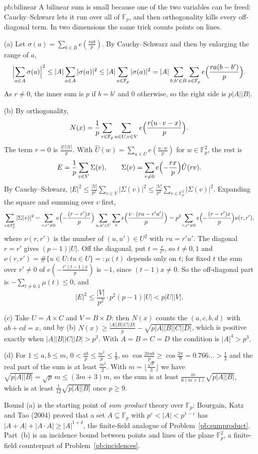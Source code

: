 \begin{solution}{pb:bilinear}
\idea A bilinear sum is small because one of the two variables can be freed: Cauchy--Schwarz lets it run over all of $\mathbb F_p$,
and then orthogonality kills every off-diagonal term. In two dimensions the same trick counts points on lines.

\writeup (a) Let $\sigma(a)=\sum_{b\in B}e(\frac{rab}p)$. By Cauchy--Schwarz and then by enlarging the range of $a$,
\[
\Bigl|\sum_{a\in A}\sigma(a)\Bigr|^2\le|A|\sum_{a\in A}|\sigma(a)|^2\le|A|\sum_{a\in\mathbb F_p}|\sigma(a)|^2=|A|\sum_{b,b'\in B}\sum_{a\in\mathbb F_p}e\Bigl(\frac{ra(b-b')}p\Bigr).
\]
As $r\ne0$, the inner sum is $p$ if $b=b'$ and $0$ otherwise, so the right side is $p|A||B|$.

(b) By orthogonality,
\[
N(x)=\frac1p\sum_{r\in\mathbb F_p}\sum_{u\in U,v\in V}e\Bigl(\frac{r(u\cdot v-x)}p\Bigr).
\]
The term $r=0$ is $\frac{|U||V|}p$. With $\hat U(w)=\sum_{u\in U}e(\frac{u\cdot w}p)$ for $w\in\mathbb F_p^2$, the rest is
\[
E=\frac1p\sum_{v\in V}\Sigma(v),\qquad\Sigma(v)=\sum_{r\ne0}e\Bigl(-\frac{rx}p\Bigr)\hat U(rv).
\]
By Cauchy--Schwarz, $|E|^2\le\frac{|V|}{p^2}\sum_{v\in V}|\Sigma(v)|^2\le\frac{|V|}{p^2}\sum_{v\in\mathbb F_p^2}|\Sigma(v)|^2$. Expanding the square and summing over $v$ first,
\[
\sum_{v\in\mathbb F_p^2}|\Sigma(v)|^2=\sum_{r,r'\ne0}e\Bigl(-\frac{(r-r')x}p\Bigr)\sum_{u,u'\in U}\sum_ve\Bigl(\frac{v\cdot(ru-r'u')}p\Bigr)=p^2\sum_{r,r'\ne0}e\Bigl(-\frac{(r-r')x}p\Bigr)\nu(r,r'),
\]
where $\nu(r,r')$ is the number of $(u,u')\in U^2$ with $ru=r'u'$. The diagonal $r=r'$ gives $(p-1)|U|$. Off the diagonal, put $t=\frac r{r'}$,
so $t\ne0,1$ and $\nu(r,r')=\#\{u\in U:tu\in U\}=:\mu(t)$ depends only on $t$; for fixed $t$ the sum over $r'\ne0$ of $e(-\frac{r'(t-1)x}p)$
is $-1$, since $(t-1)x\ne0$. So the off-diagonal part is $-\sum_{t\ne0,1}\mu(t)\le0$, and
\[
|E|^2\le\frac{|V|}{p^2}\cdot p^2(p-1)|U|<p|U||V|.
\]

(c) Take $U=A\times C$ and $V=B\times D$: then $N(x)$ counts the $(a,c,b,d)$ with $ab+cd=x$, and by (b)
$N(x)\ge\frac{|A||B||C||D|}p-\sqrt{p|A||B||C||D|}$, which is positive exactly when $|A||B||C||D|>p^3$. With $A=B=C=D$ the condition is $|A|^4>p^3$.

(d) For $1\le a,b\le m$, $0<\frac{ab}p\le\frac{m^2}p\le\frac19$, so $\cos\frac{2\pi ab}p\ge\cos\frac{2\pi}9=0.766\ldots>\frac12$ and the real part of the sum is at
least $\frac{m^2}2$. With $m=\lfloor\frac{\sqrt p}3\rfloor$ we have $\sqrt{p|A||B|}=\sqrt p\,m\le(3m+3)m$, so the sum is at least
$\frac{m}{6(m+1)}\sqrt{p|A||B|}$, which is at least $\frac1{12}\sqrt{p|A||B|}$ once $p\ge9$.

\leads Bound (a) is the starting point of \emph{sum--product} theory over $\mathbb F_p$: Bourgain, Katz and Tao (2004) proved that a set
$A\subseteq\mathbb F_p$ with $p^\varepsilon<|A|<p^{1-\varepsilon}$ has $|A+A|+|A\cdot A|\ge|A|^{1+\delta}$, the finite-field analogue of Problem~\ref{pb:sumproduct}. Part~(b) is an
incidence bound between points and lines of the plane $\mathbb F_p^2$, a finite-field counterpart of Problem~\ref{pb:incidences}.
\end{solution}

